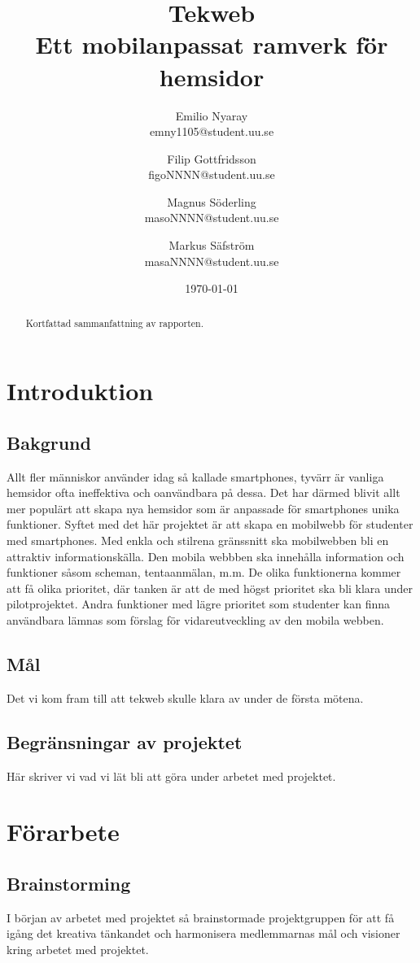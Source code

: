 \documentclass[11pt,a4paper]{report}
\title{Tekweb \\ \large{Ett mobilanpassat ramverk för hemsidor}}
\author{Emilio Nyaray \\ emny1105@student.uu.se      \and
        Filip Gottfridsson \\ figoNNNN@student.uu.se \and
        Magnus Söderling \\ masoNNNN@student.uu.se      \and
        Markus Säfström \\ masaNNNN@student.uu.se
}
\date{\today}
\begin{document}
\maketitle

\begin{abstract}
Kortfattad sammanfattning av rapporten.
\end{abstract}

\tableofcontents
\newpage

\chapter{Introduktion}
\section{Bakgrund}
Allt fler människor använder idag så kallade smartphones, tyvärr är
vanliga hemsidor ofta ineffektiva och oanvändbara på dessa. Det har
därmed blivit allt mer populärt att skapa nya hemsidor som är anpassade
för smartphones unika funktioner. Syftet med det här projektet är att
skapa en mobilwebb för studenter med smartphones. Med enkla och stilrena
gränssnitt ska mobilwebben bli en attraktiv informationskälla. Den
mobila webbben ska innehålla information och funktioner såsom scheman,
tentaanmälan, m.m. De olika funktionerna kommer att få olika prioritet,
där tanken är att de med högst prioritet ska bli klara under
pilotprojektet. Andra funktioner med lägre prioritet som studenter kan
finna användbara lämnas som förslag för vidareutveckling av den mobila
webben.

\section{Mål}
Det vi kom fram till att tekweb skulle klara av under de första mötena.

\section{Begränsningar av projektet}
Här skriver vi vad vi lät bli att göra under arbetet med projektet.

\chapter{Förarbete}
\section{Brainstorming}
I början av arbetet med projektet så brainstormade projektgruppen för
att få igång det kreativa tänkandet och harmonisera medlemmarnas mål och
visioner kring arbetet med projektet.
\end{document}
